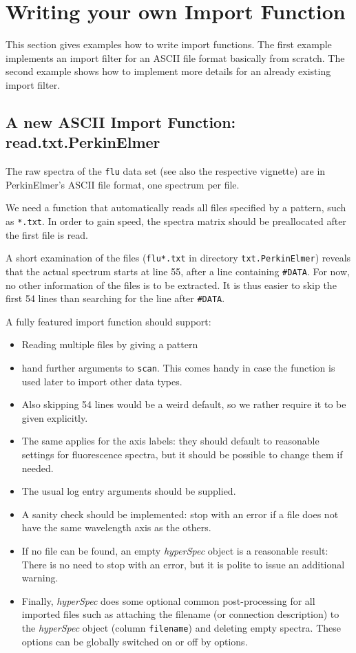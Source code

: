 \documentclass[english, a4paper, 10pt, headings=small, DIV11]{scrartcl}
\newcommand{\Rcode}[2][]{\texorpdfstring{\nohyphens{#1\texttt{#2}}}{#2}}
\newcommand{\Robject}[2][]{\texorpdfstring{\nohyphens{#1\texttt{#2}}}{#2}}
\newcommand{\Rfunction}[2][]{\texorpdfstring{\nohyphens{#1\texttt{#2}}}{#2}}
\newcommand{\Rclass}[1]{\texorpdfstring{\nohyphens{\textit{#1}}}{#1}}
\newcommand{\phy}{\texorpdfstring{\nohyphens{\textit{hyperSpec}}}{hyperSpec}\xspace}
\newcommand{\chy}{\Rclass{hyperSpec}\xspace}
\begin{document}
\section{Writing your own Import Function}
\label{sec:writing-Import}
This section gives examples how to write import functions. The first example implements an import
filter for an ASCII file format basically from scratch. The second example shows how to implement
more details for an already existing import filter.

\subsection{A new ASCII Import Function: read.txt.PerkinElmer}
\label{sec:read.txt.PerkinElmer}
The raw spectra of the \Robject{flu} data set (see also the respective vignette) are in PerkinElmer's ASCII file format, one spectrum per file.

We need a function that automatically reads all files specified by a pattern, such as \texttt{*.txt}.
In order to gain speed, the spectra matrix should be preallocated after the first file is read.

A short examination of the files (\texttt{flu*.txt} in directory \texttt{txt.PerkinElmer}) reveals
that the actual spectrum starts at line 55, after a line containing \texttt{\#DATA}.
For now, no other information of the files is to be extracted. It is thus easier to skip the first 54
lines than searching for the line after \texttt{\#DATA}.

A fully featured import function should support:
\begin{itemize}
\item Reading multiple files by giving a pattern
\item hand further arguments to \Rfunction{scan}. This comes handy in case the function is used later
to import other data types.
\item Also skipping 54 lines would be a weird default, so we rather require it to be given
explicitly.
\item The same applies for the axis labels: they should default to reasonable settings for
fluorescence spectra, but it should be possible to change them if needed.
\item The usual log entry arguments should be supplied.
\item A sanity check should be implemented: stop with an error if a file does not have the same
wavelength axis as the others.
\item If no file can be found, an empty \chy object is a reasonable result: There is no need
to stop with an error, but it is polite to issue an additional warning.
\item Finally, \phy does some optional common post-processing for all imported files such as attaching the filename (or connection description) to the \chy object (column \Rcode{filename}) and deleting empty spectra. These options can be globally switched on or off by options.
\end{itemize}
\end{document}
